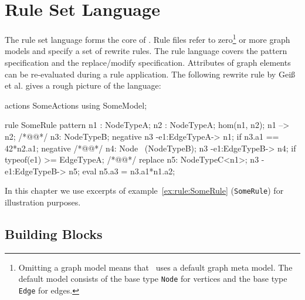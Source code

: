 \chapter{Rule Set Language}
\label{chaprulelang}

The rule set language forms the core of \GrG. Rule files refer to zero\footnote{Omitting a graph model means that \GrG\ uses a default graph meta model. The default model consists of the base type \texttt{Node} for vertices and the base type \texttt{Edge} for edges.} or more graph models and specify a set of rewrite rules. The rule language covers the pattern specification and the replace/modify specification. Attributes of graph elements can be re-evaluated during a rule application. The following rewrite rule by Geiß et al. \cite{geiss} gives a rough picture of the language:
\begin{example}\label{ex:rule:SomeRule}
\begin{grgen}
actions SomeActions using SomeModel;

rule SomeRule {
  pattern {
    n1 : NodeTypeA;
    n2 : NodeTypeA;
    hom(n1, n2);
    n1 --> n2; /*@\label{ex:somerule:graphlet}@*/
    n3: NodeTypeB;
    negative {
      n3 -e1:EdgeTypeA-> n1;
      if {n3.a1 == 42*n2.a1;}
    }
    negative { /*@\label{ex:somerule:secondnac:begin}@*/
      n4: Node \ (NodeTypeB);
      n3 -e1:EdgeTypeB-> n4;
      if {typeof(e1) >= EdgeTypeA;}
    } /*@\label{ex:somerule:secondnac:end}@*/
  }
  replace {
    n5: NodeTypeC<n1>;
    n3 -e1:EdgeTypeB-> n5;
    eval {
      n5.a3 = n3.a1*n1.a2;
    }
  }  
}
\end{grgen}
\end{example}
In this chapter we use excerpts of example~\ref{ex:rule:SomeRule} (\texttt{SomeRule}) for illustration purposes.

\section{Building Blocks}
\label{rulebb}

